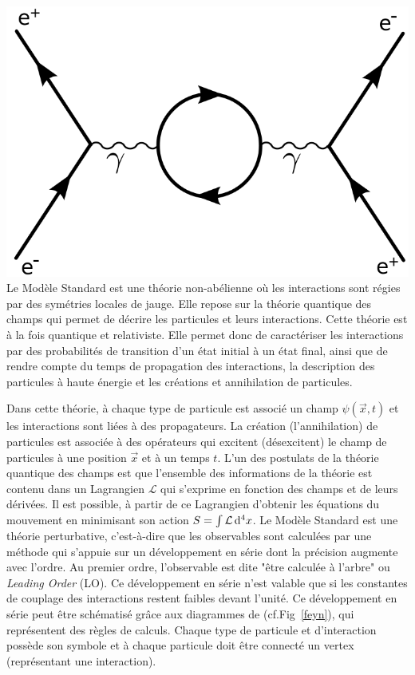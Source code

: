 {	\includegraphics[width=\marginparwidth]{SM/feyn3.png}
	\label{feyn}
}
Le Modèle Standard est une théorie non-abélienne où les interactions sont régies par des symétries locales de jauge. Elle repose sur la théorie quantique des champs qui permet de décrire les particules et leurs interactions. Cette théorie est à la fois quantique et relativiste. Elle permet donc de caractériser les interactions par des probabilités de transition d'un état initial à un état final, ainsi que de rendre compte du temps de propagation des interactions, la description des particules à haute énergie et les créations et annihilation de particules.

Dans cette théorie, à chaque type de particule est associé un champ $\psi(\vec{x},t)$ et les interactions sont liées à des propagateurs. La création (l'annihilation) de particules est associée à des opérateurs qui excitent (désexcitent) le champ de particules à une position $\vec{x}$ et à un temps $t$. L'un des postulats de la théorie quantique des champs est que l'ensemble des informations de la théorie est contenu dans un Lagrangien $\mathcal{L}$ qui s'exprime en fonction des champs et de leurs dérivées. Il est possible, à partir de ce Lagrangien d'obtenir les équations du mouvement en minimisant son action $S=\int\mathcal{L}\mathop{}\!\mathrm{d^4}{x}$.
Le Modèle Standard est une théorie perturbative, c'est-à-dire que les observables sont calculées par une méthode qui s'appuie sur un développement en série dont la précision augmente avec l'ordre. Au premier ordre, l'observable est dite "être calculée à l'arbre" ou \textit{Leading Order} (LO). Ce développement en série n'est valable que si les constantes de couplage des interactions restent faibles devant l'unité. Ce développement en série peut être schématisé grâce aux diagrammes de  (cf.Fig~\ref{feyn}), qui représentent des règles de calculs. Chaque type de particule et d'interaction possède son symbole et à chaque particule doit être connecté un vertex (représentant une interaction).

